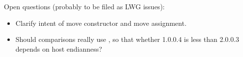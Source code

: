 Open questions (probably to be filed as LWG issues):
\begin{itemize}
\item
Clarify intent of  move constructor and move assignment.
\item
Should  comparisons really use ,
so that whether 1.0.0.4 is less than 2.0.0.3 depends on host endianness?
\end{itemize}


\newpage


{}
\hypertarget{toctarget}{\tableofcontents*}

\setcounter{tocdepth}{5}

%
